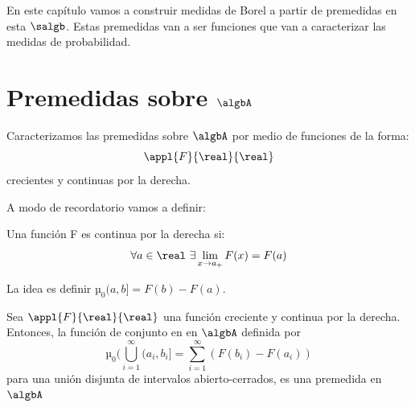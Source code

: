 \documentclass{apuntes}
\begin{document}
En este capítulo vamos a construir medidas de Borel a partir de premedidas en esta $\salgb$. Estas premedidas van a ser funciones que van a caracterizar las medidas de probabilidad.

\section{Premedidas sobre $\algbA$}
Caracterizamos las premedidas sobre $\algbA$ por medio de funciones de la forma:
\[\appl{F}{\real}{\real}\]
crecientes y continuas por la derecha.

A modo de recordatorio vamos a definir:

\begin{defn}
Una función F es continua por la derecha si:
\[\forall a \in \real \ \exists \lim_{x \to a_+}F(x)=F(a)\]
\end{defn}

La idea es definir $µ_0(a,b]=F(b)-F(a)$.

\begin{prop}
Sea $\appl{F}{\real}{\real}$ una función creciente y continua por la derecha. Entonces, la función de conjunto en en $\algbA$ definida por
\[µ_0(\bigcup_{i=1}^{\infty}(a_i, b_i] = \sum_{i=1}^{\infty}(F(b_i)-F(a_i))\]
para una unión disjunta de intervalos abierto-cerrados, es una premedida en $\algbA$
\end{prop}
\end{document}
